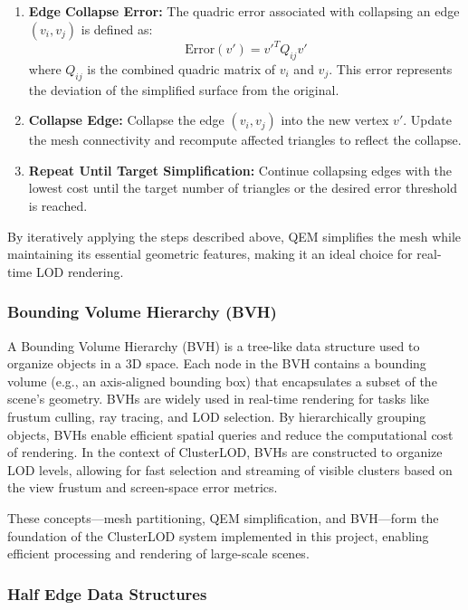 \documentclass[12pt]{extarticle}
\begin{document}
\begin{enumerate}
    \item \textbf{Edge Collapse Error:}
    The quadric error associated with collapsing an edge \((v_i, v_j)\) is defined as:
    \[
    \text{Error}(v') = v'^T Q_{ij} v'
    \]
    where \(Q_{ij}\) is the combined quadric matrix of \(v_i\) and \(v_j\). This error represents the deviation of the simplified surface from the original.

    \item \textbf{Collapse Edge:}
    Collapse the edge \((v_i, v_j)\) into the new vertex \(v'\). Update the mesh connectivity and recompute affected triangles to reflect the collapse.

    \item \textbf{Repeat Until Target Simplification:}
    Continue collapsing edges with the lowest cost until the target number of triangles or the desired error threshold is reached.

\end{enumerate}

By iteratively applying the steps described above, QEM simplifies the mesh while maintaining its essential geometric features, 
making it an ideal choice for real-time LOD rendering.
 

\subsubsection{Bounding Volume Hierarchy (BVH)}
A Bounding Volume Hierarchy (BVH) is a tree-like data structure used to organize objects in a 3D space. Each node in the BVH contains 
a bounding volume (e.g., an axis-aligned bounding box) that encapsulates a subset of the scene's geometry. BVHs are widely used in 
real-time rendering for tasks like frustum culling, ray tracing, and LOD selection. By hierarchically grouping objects, BVHs enable 
efficient spatial queries and reduce the computational cost of rendering. In the context of ClusterLOD, BVHs are constructed to 
organize LOD levels, allowing for fast selection and streaming of visible clusters based on the view frustum and screen-space error 
metrics.

These concepts—mesh partitioning, QEM simplification, and BVH—form the foundation of the ClusterLOD system implemented in this project, 
enabling efficient processing and rendering of large-scale scenes.

\subsubsection{Half Edge Data Structures}
\end{document}
